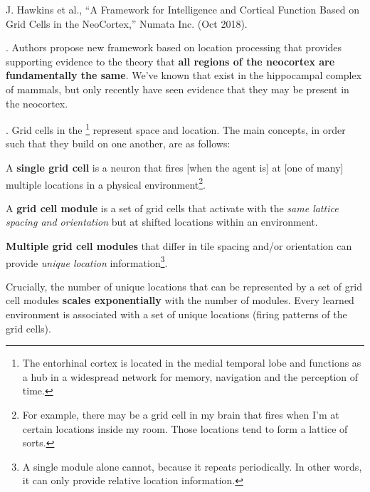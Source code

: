 \documentclass[11pt]{article}
\begin{document}
\vspace{-1em}
{\footnotesize J. Hawkins et al., ``A Framework for Intelligence and Cortical Function Based on Grid Cells in the NeoCortex,'' Numata Inc. (Oct 2018).}


\p {}. Authors propose new framework based on location processing that provides supporting evidence to the theory that \textbf{all regions of the neocortex are fundamentally the same}. We've known that  exist in the hippocampal complex of mammals, but only recently have seen evidence that they may be present in the neocortex.

\myspace
\p {}. Grid cells in the \footnote{The entorhinal cortex is located in the medial temporal lobe and functions as a hub in a widespread network for memory, navigation and the perception of time.} represent space and location. The main concepts, in order such that they build on one another, are as follows:
\begin{compactitem}
	\item A \textbf{single grid cell} is a neuron that fires [when the agent is] at [one of many] multiple locations in a physical environment\footnote{For example, there may be a grid cell in my brain that fires when I'm at certain locations inside my room. Those locations tend to form a lattice of sorts.}.
	
	\item A \textbf{grid cell module} is a set of grid cells that activate with the \textit{same lattice spacing and orientation} but at shifted locations within an environment. 
	
	\item \textbf{Multiple grid cell modules} that differ in tile spacing and/or orientation can provide \textit{unique location} information\footnote{A single module alone cannot, because it repeats periodically. In other words, it can only provide relative location information.}.
\end{compactitem}
Crucially, the number of unique locations that can be represented by a set of grid cell modules \textbf{scales exponentially} with the number of modules. Every learned environment is associated with a set of unique locations (firing patterns of the grid cells).
\end{document}
